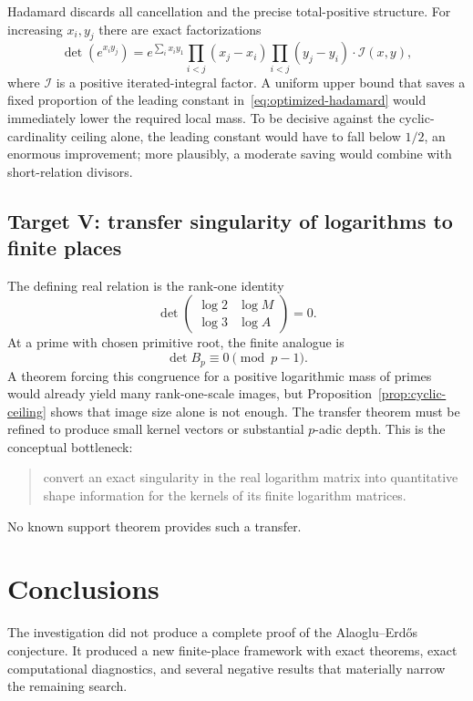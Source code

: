 \documentclass[11pt]{article}
\theoremstyle{definition}
\theoremstyle{remark}
\begin{document}
Hadamard discards all cancellation and the precise total-positive structure.  For increasing $x_i,y_j$ there are exact factorizations
\[
 \det(e^{x_i y_j})
 =e^{\sum_i x_i y_1}
  \prod_{i<j}(x_j-x_i)
  \prod_{i<j}(y_j-y_i)
  \cdot \mathcal I(x,y),
\]
where $\mathcal I$ is a positive iterated-integral factor.  A uniform upper bound that saves a fixed proportion of the leading constant in~\eqref{eq:optimized-hadamard} would immediately lower the required local mass.  To be decisive against the cyclic-cardinality ceiling alone, the leading constant would have to fall below $1/2$, an enormous improvement; more plausibly, a moderate saving would combine with short-relation divisors.

\subsection{Target V: transfer singularity of logarithms to finite places}

The defining real relation is the rank-one identity
\[
 \det\begin{pmatrix}\log2&\log M\\\log3&\log A\end{pmatrix}=0.
\]
At a prime with chosen primitive root, the finite analogue is
\[
 \det B_p\equiv0\pmod{p-1}.
\]
A theorem forcing this congruence for a positive logarithmic mass of primes would already yield many rank-one-scale images, but Proposition~\ref{prop:cyclic-ceiling} shows that image size alone is not enough.  The transfer theorem must be refined to produce small kernel vectors or substantial $p$-adic depth.  This is the conceptual bottleneck:
\begin{quote}
convert an exact singularity in the real logarithm matrix into quantitative shape information for the kernels of its finite logarithm matrices.
\end{quote}
No known support theorem provides such a transfer.

\section{Conclusions}
\label{sec:conclusion}

The investigation did not produce a complete proof of the Alaoglu--Erd\H{o}s conjecture.  It produced a new finite-place framework with exact theorems, exact computational diagnostics, and several negative results that materially narrow the remaining search.
\end{document}
